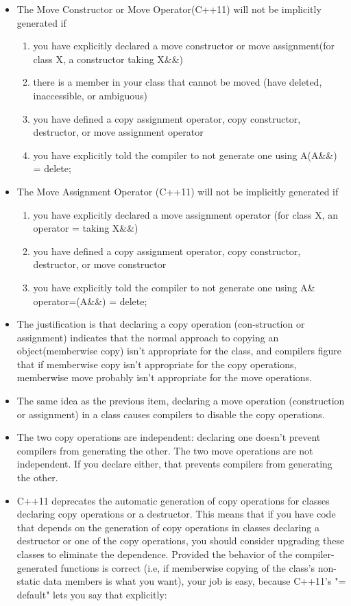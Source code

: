 \documentclass[a4paper,12pt,twoside]{book}
\begin{document}
\begin{itemize}
\item The Move Constructor or Move Operator(C++11) will not be implicitly generated if
\begin{enumerate}
\item you have explicitly declared a move constructor or move assignment(for class X, a constructor taking X\&\&)
\item there is a member in your class that cannot be moved (have deleted, inaccessible, or ambiguous)
\item you have defined a copy assignment operator, copy constructor, destructor, or move assignment operator
\item you have explicitly told the compiler to not generate one using A(A\&\&) = delete;
\end{enumerate}


\item The Move Assignment Operator (C++11) will not be implicitly generated if
\begin{enumerate}
\item you have explicitly declared a move assignment operator (for class X, an operator = taking X\&\&)
\item you have defined a copy assignment operator, copy constructor, destructor, or move constructor
\item you have explicitly told the compiler to not generate one using A\& operator=(A\&\&) = delete;
\end{enumerate}

\item  The justification is that declaring a copy operation (con‐struction or assignment) indicates that the normal approach to copying an object(memberwise copy) isn't appropriate for the class, and compilers figure that if memberwise copy isn't appropriate for the copy operations, memberwise move probably isn't appropriate for the move operations.

\item The same idea as the previous item, declaring a move operation (construction or assignment) in a class causes compilers to disable the copy operations.

\item The two copy operations are independent: declaring one doesn't prevent compilers
from generating the other. The two move operations are not independent. If you declare either, that prevents compilers from generating the other.

\item C++11 deprecates the automatic generation of copy operations for classes declaring
copy operations or a destructor. This means that if you have code that depends on
the generation of copy operations in classes declaring a destructor or one of the copy
operations, you should consider upgrading these classes to eliminate the dependence.
Provided the behavior of the compiler-generated functions is correct (i.e, if memberwise
copying of the class's non-static data members is what you want), your job is
easy, because C++11's "= default" lets you say that explicitly:


\end{itemize}
\end{document}
